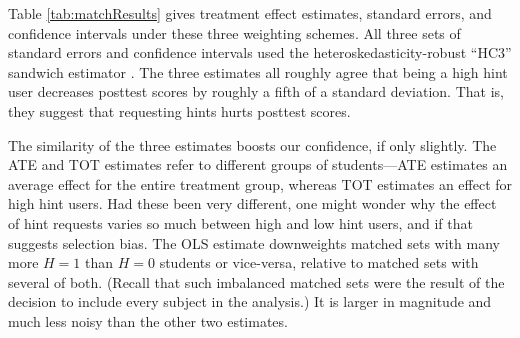 \documentclass{article}\usepackage[]{graphicx}\usepackage[]{color}
\begin{document}


Table \ref{tab:matchResults} gives treatment effect estimates,
standard errors, and confidence intervals under these three weighting
schemes.
All three sets of standard errors
and confidence intervals used the heteroskedasticity-robust ``HC3'' sandwich estimator
\citep{sandwichPackage}.
The three estimates all roughly agree that being a high hint user
decreases posttest scores by roughly a fifth of a standard deviation.
That is, they suggest that requesting hints hurts posttest scores.

The similarity of the three estimates boosts our confidence, if only
slightly. The ATE and TOT estimates refer to different groups
of students---ATE estimates an average effect for the entire treatment
group, whereas TOT estimates an effect for high hint users. Had these
been very different, one might wonder why the effect of hint requests
varies so much between high and low hint users, and if that suggests
selection bias.
The OLS estimate downweights matched sets with many more $H=1$ than
$H=0$ students or vice-versa, relative to matched sets with several of
both.
(Recall that such imbalanced matched sets were the result of the
decision to include every subject in the analysis.)
It is larger in magnitude and much less noisy than the other two
estimates.
\end{document}
